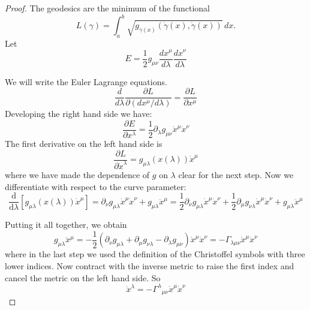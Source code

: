 \begin{proof}
The geodesics are the minimum of  the functional
\[L(\gamma)=\int_a^b \sqrt{  g_{\gamma(x)}(\dot\gamma(x),\dot\gamma(x)) }\,dx.\]
Let 
\[E=\frac{1}{2} g_{\mu\nu}\frac{dx^\mu}{d\lambda}\frac{dx^\nu}{d\lambda}\]

We will write the Euler Lagrange equations. 
$$\frac{d}{d\lambda}\frac{\partial L}{\partial(dx^\mu/d\lambda)} = \frac{\partial L}{\partial x^\mu} $$
Developing the right hand side we have:
$$\frac{\partial E}{\partial x^\lambda}=\frac{1}{2}\partial_\lambda g_{\mu\nu}\dot x^\mu\dot x^\nu$$
The first derivative on the left hand side  is
$$\frac{\partial L}{\partial \dot x^\lambda}=g_{\mu\lambda}(x(\lambda))\dot x^\mu$$
where we have made the dependence of $g$ on $\lambda$ clear for the next step. Now we differentiate with respect to the curve parameter:
$$\frac{\mathrm{d}}{\mathrm{d}\lambda}[g_{\mu\lambda}(x(\lambda))\dot x^\mu]=\partial_\nu g_{\mu\lambda}\dot x^\mu\dot x^\nu+g_{\mu\lambda}\ddot x^\mu=\frac{1}{2}\partial_\nu g_{\mu\lambda}\dot x^\mu\dot x^\nu+\frac{1}{2}\partial_\mu g_{\nu\lambda}\dot x^\mu\dot x^\nu+g_{\mu\lambda}\ddot x^\mu$$

Putting it all together, we obtain
$$g_{\mu\lambda}\ddot x^\mu=-\frac{1}{2}\left(\partial_\nu g_{\mu\lambda}+\partial_\mu g_{\nu\lambda}-\partial_\lambda g_{\mu\nu}\right)\dot x^\mu\dot x^\nu=-\Gamma_{\lambda\mu\nu}\dot x^\mu\dot x^\nu$$
where in the last step we used the definition of the Christoffel symbols with three lower indices. Now contract with the inverse metric to raise the first index and cancel the metric on the left hand side. So
$$\ddot x^\lambda=-\Gamma^\lambda{}_{\mu\nu}\dot x^\mu\dot x^\nu$$
\end{proof}